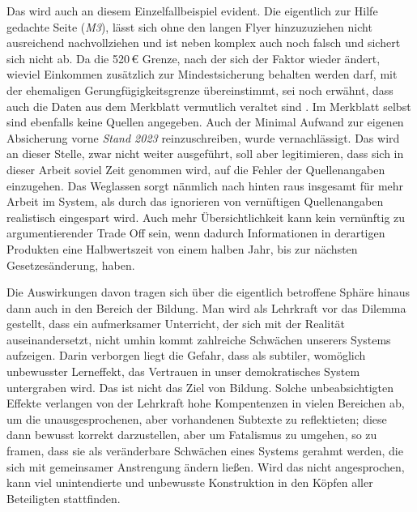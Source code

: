 Das wird auch an diesem Einzelfallbeispiel evident. Die eigentlich zur Hilfe gedachte Seite (\emph{M3}), lässt sich ohne den langen Flyer hinzuzuziehen nicht ausreichend nachvollziehen und ist neben komplex auch noch falsch und sichert sich nicht ab. 
Da die 520\,€ Grenze, nach der sich der Faktor wieder ändert, wieviel Einkommen zusätzlich zur Mindestsicherung behalten werden darf, mit der ehemaligen Gerungfügigkeitsgrenze übereinstimmt, sei noch erwähnt, dass auch die Daten aus dem Merkblatt vermutlich veraltet sind \autocite[59-62]{MerkblattSGBII}. Im Merkblatt selbst sind ebenfalls keine Quellen angegeben. Auch der Minimal Aufwand zur eigenen Absicherung vorne \emph{Stand 2023} reinzuschreiben, wurde vernachlässigt. Das wird an dieser Stelle, zwar nicht weiter ausgeführt, soll aber legitimieren, dass sich in dieser Arbeit soviel Zeit genommen wird, auf die Fehler der Quellenangaben einzugehen. Das Weglassen sorgt nänmlich nach hinten raus insgesamt für mehr Arbeit im System, als durch das ignorieren von vernüftigen Quellenangaben realistisch eingespart wird. Auch mehr Übersichtlichkeit kann kein vernünftig zu argumentierender Trade Off sein, wenn dadurch Informationen in derartigen Produkten eine Halbwertszeit von einem halben Jahr, bis zur nächsten Gesetzesänderung, haben.
\bigskip

Die Auswirkungen davon tragen sich über die eigentlich betroffene Sphäre hinaus dann auch in den Bereich der Bildung. Man wird als Lehrkraft vor das Dilemma gestellt, dass ein aufmerksamer Unterricht, der sich mit der Realität auseinandersetzt, nicht umhin kommt zahlreiche Schwächen unserers Systems aufzeigen. Darin verborgen liegt die Gefahr, dass als subtiler, womöglich unbewusster Lerneffekt, das Vertrauen in unser demokratisches System untergraben wird. Das ist nicht das Ziel von Bildung. 
Solche unbeabsichtigten Effekte verlangen von der Lehrkraft hohe Kompentenzen in vielen Bereichen ab, um die unausgesprochenen, aber vorhandenen Subtexte zu reflektieten; diese dann bewusst korrekt darzustellen, aber um Fatalismus zu umgehen, so zu framen, dass sie als veränderbare Schwächen eines Systems gerahmt werden, die sich mit gemeinsamer Anstrengung ändern ließen. Wird das nicht angesprochen, kann viel unintendierte und unbewusste Konstruktion in den Köpfen aller Beteiligten stattfinden. 




